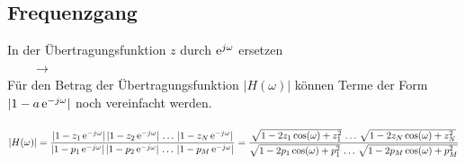 	\subsection{Frequenzgang }
		In der Übertragungsfunktion $z$ durch $\mathrm{e}^{j\omega}$ ersetzen\\[0.2cm]
		$\qquad\rightarrow\qquad$
		\\[0.2cm]
		Für den Betrag der Übertragungsfunktion $|H(\omega)|$ können Terme der Form $|1-a\,\mathrm{e}^{-j\omega}|$ noch vereinfacht werden.\\[0.2cm]
		\\[0.2cm]
		$|H(\omega)| = \dfrac{|1-z_1\,\mathrm{e}^{-j\omega}|\,|1-z_2\,\mathrm{e}^{-j\omega}|\,\dots\,|1-z_N\,\mathrm{e}^{-j\omega}|}{|1-p_1\,\mathrm{e}^{-j\omega}|\,|1-p_2\,\mathrm{e}^{-j\omega}|\,\dots\,|1-p_M\,\mathrm{e}^{-j\omega}|} = \dfrac{\sqrt{1-2z_1\cos(\omega)+z_1^2}\,\dots\,\sqrt{1-2z_N\cos(\omega)+z_N^2}}{\sqrt{1-2p_1\cos(\omega)+p_1^2}\,\dots\,\sqrt{1-2p_M\cos(\omega)+p_M^2}}$

